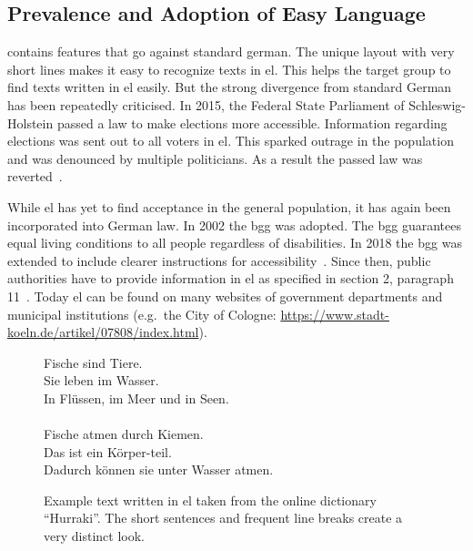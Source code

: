 \subsection{Prevalence and Adoption of Easy Language}\label{subsec:el-adop}

 contains features that go against standard german.
The unique layout with very short lines makes it easy to recognize texts in \gls{el}.
This helps the target group to find texts written in \gls{el} easily.
But the strong divergence from standard German has been repeatedly criticised.
In 2015, the Federal State Parliament of Schleswig-Holstein passed a law to make elections more accessible.
Information regarding elections was sent out to all voters in \gls{el}.
This sparked outrage in the population and was denounced by multiple politicians.
As a result the passed law was reverted~\autocite{easyLanguageBook}.

While \gls{el} has yet to find acceptance in the general population, it has again been incorporated into German law.
In 2002 the \gls{bgg} was adopted.
The \gls{bgg} guarantees equal living conditions to all people regardless of disabilities.
In 2018 the \gls{bgg} was extended to include clearer instructions for accessibility~\autocite{bggInfo}.
Since then, public authorities have to provide information in \gls{el} as specified in section 2, paragraph 11~\autocite{bgg2018}.
Today \gls{el} can be found on many websites of government departments and municipal institutions (e.g.\ the City of Cologne: \url{https://www.stadt-koeln.de/artikel/07808/index.html}).

\begin{figure}
    \centering
    \colorbox{goodgreen!20}{
        \begin{minipage}{0.6\textwidth}
            Fische sind Tiere. \\
            Sie leben im Wasser. \\
            In Flüssen, im Meer und in Seen. \\
            \\
            Fische atmen durch Kiemen. \\
            Das ist ein Körper-teil. \\
            Dadurch können sie unter Wasser atmen.
        \end{minipage}
    }
    \caption[Example text written in .]{Example text written in \gls{el} taken from the online dictionary \enquote{Hurraki}\footnotemark.
    The short sentences and frequent line breaks create a very distinct look.}
    \label{fig:easy_text}
\end{figure}


